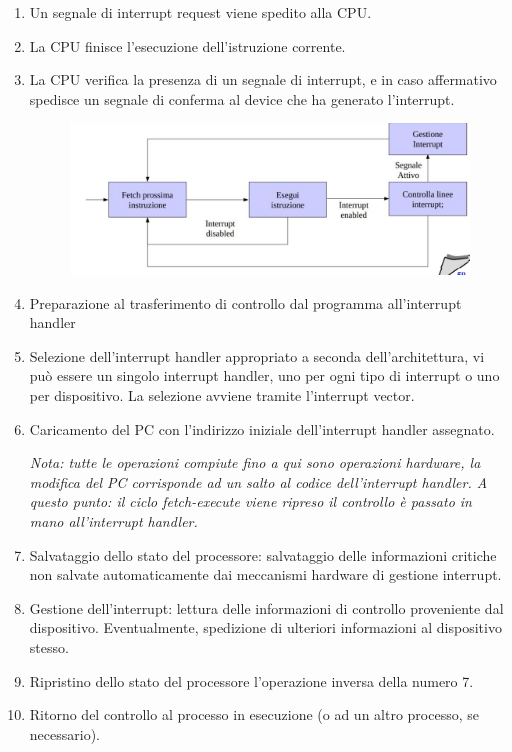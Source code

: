 \begin{enumerate}
    \item Un segnale di interrupt request viene spedito alla CPU.
    \item La CPU finisce l'esecuzione dell'istruzione corrente.
    \item La CPU verifica la presenza di un segnale di interrupt, e
in caso affermativo spedisce un segnale di conferma al device
che ha generato l'interrupt.

\begin{figure} [h]
    \centering
    \includegraphics[width=0.7\linewidth]{Images/Screenshot 2024-12-16 132946.png}
    \label{fig:enter-label}
\end{figure}

\item  Preparazione al trasferimento di controllo dal programma all'interrupt handler
\item Selezione dell'interrupt handler appropriato a seconda dell'architettura, vi può essere un singolo interrupt handler,
uno per ogni tipo di interrupt o uno per dispositivo. La selezione avviene tramite l'interrupt vector.
\item Caricamento del PC con l'indirizzo iniziale dell'interrupt handler assegnato.

\small \textit{Nota: tutte le operazioni compiute fino a qui sono operazioni hardware, la modifica del PC corrisponde ad un salto al codice dell'interrupt handler.
A questo punto: il ciclo fetch-execute viene ripreso il controllo è passato in mano all'interrupt handler.}
\item Salvataggio dello stato del processore: salvataggio delle informazioni critiche non salvate automaticamente
dai meccanismi hardware di gestione interrupt.
\item Gestione dell'interrupt: 
lettura delle informazioni di controllo proveniente dal dispositivo. Eventualmente, spedizione di ulteriori informazioni al dispositivo stesso.
\item Ripristino dello stato del processore
l'operazione inversa della numero 7.
\item Ritorno del controllo al processo in esecuzione
(o ad un altro processo, se necessario).


\end{enumerate}


